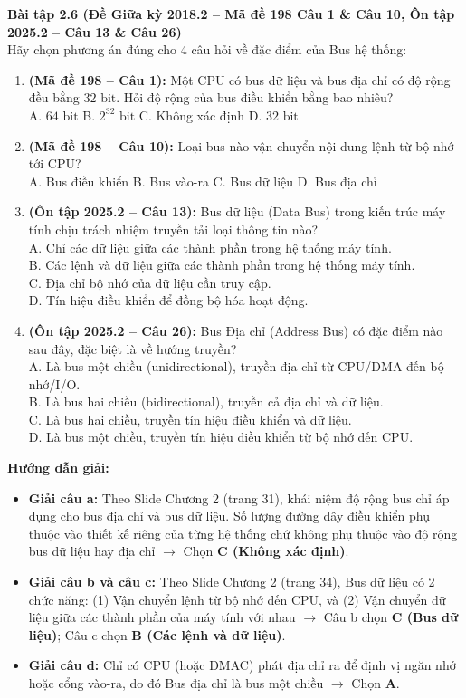 \textbf{Bài tập 2.6 (Đề Giữa kỳ 2018.2 -- Mã đề 198 Câu 1 \& Câu 10, Ôn tập 2025.2 -- Câu 13 \& Câu 26)}\\
Hãy chọn phương án đúng cho 4 câu hỏi về đặc điểm của Bus hệ thống:
\begin{enumerate}[label=\alph*)]
    \item \textbf{(Mã đề 198 -- Câu 1):} Một CPU có bus dữ liệu và bus địa chỉ có độ rộng đều bằng $32\text{ bit}$. Hỏi độ rộng của bus điều khiển bằng bao nhiêu?\\
    A. $64\text{ bit}$ \quad B. $2^{32}\text{ bit}$ \quad C. Không xác định \quad D. $32\text{ bit}$
    \item \textbf{(Mã đề 198 -- Câu 10):} Loại bus nào vận chuyển nội dung lệnh từ bộ nhớ tới CPU?\\
    A. Bus điều khiển \quad B. Bus vào-ra \quad C. Bus dữ liệu \quad D. Bus địa chỉ
    \item \textbf{(Ôn tập 2025.2 -- Câu 13):} Bus dữ liệu (Data Bus) trong kiến trúc máy tính chịu trách nhiệm truyền tải loại thông tin nào?\\
    A. Chỉ các dữ liệu giữa các thành phần trong hệ thống máy tính.\\
    B. Các lệnh và dữ liệu giữa các thành phần trong hệ thống máy tính.\\
    C. Địa chỉ bộ nhớ của dữ liệu cần truy cập.\\
    D. Tín hiệu điều khiển để đồng bộ hóa hoạt động.
    \item \textbf{(Ôn tập 2025.2 -- Câu 26):} Bus Địa chỉ (Address Bus) có đặc điểm nào sau đây, đặc biệt là về hướng truyền?\\
    A. Là bus một chiều (unidirectional), truyền địa chỉ từ CPU/DMA đến bộ nhớ/I/O.\\
    B. Là bus hai chiều (bidirectional), truyền cả địa chỉ và dữ liệu.\\
    C. Là bus hai chiều, truyền tín hiệu điều khiển và dữ liệu.\\
    D. Là bus một chiều, truyền tín hiệu điều khiển từ bộ nhớ đến CPU.
\end{enumerate}
\textbf{Hướng dẫn giải:}
\begin{itemize}
    \item \textbf{Giải câu a:} Theo Slide Chương 2 (trang 31), khái niệm độ rộng bus chỉ áp dụng cho bus địa chỉ và bus dữ liệu. Số lượng đường dây điều khiển phụ thuộc vào thiết kế riêng của từng hệ thống chứ không phụ thuộc vào độ rộng bus dữ liệu hay địa chỉ $\rightarrow$ Chọn \textbf{C (Không xác định)}.
    \item \textbf{Giải câu b và câu c:} Theo Slide Chương 2 (trang 34), Bus dữ liệu có 2 chức năng: (1) Vận chuyển lệnh từ bộ nhớ đến CPU, và (2) Vận chuyển dữ liệu giữa các thành phần của máy tính với nhau $\rightarrow$ Câu b chọn \textbf{C (Bus dữ liệu)}; Câu c chọn \textbf{B (Các lệnh và dữ liệu)}.
    \item \textbf{Giải câu d:} Chỉ có CPU (hoặc DMAC) phát địa chỉ ra để định vị ngăn nhớ hoặc cổng vào-ra, do đó Bus địa chỉ là bus một chiều $\rightarrow$ Chọn \textbf{A}.
\end{itemize}

